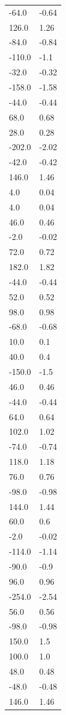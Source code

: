 \begin{longtable}{ll}
-64.0 & -0.64 \\
126.0 & 1.26 \\
-84.0 & -0.84 \\
-110.0 & -1.1 \\
-32.0 & -0.32 \\
-158.0 & -1.58 \\
-44.0 & -0.44 \\
68.0 & 0.68 \\
28.0 & 0.28 \\
-202.0 & -2.02 \\
-42.0 & -0.42 \\
146.0 & 1.46 \\
4.0 & 0.04 \\
4.0 & 0.04 \\
46.0 & 0.46 \\
-2.0 & -0.02 \\
72.0 & 0.72 \\
182.0 & 1.82 \\
-44.0 & -0.44 \\
52.0 & 0.52 \\
98.0 & 0.98 \\
-68.0 & -0.68 \\
10.0 & 0.1 \\
40.0 & 0.4 \\
-150.0 & -1.5 \\
46.0 & 0.46 \\
-44.0 & -0.44 \\
64.0 & 0.64 \\
102.0 & 1.02 \\
-74.0 & -0.74 \\
118.0 & 1.18 \\
76.0 & 0.76 \\
-98.0 & -0.98 \\
144.0 & 1.44 \\
60.0 & 0.6 \\
-2.0 & -0.02 \\
-114.0 & -1.14 \\
-90.0 & -0.9 \\
96.0 & 0.96 \\
-254.0 & -2.54 \\
56.0 & 0.56 \\
-98.0 & -0.98 \\
150.0 & 1.5 \\
100.0 & 1.0 \\
48.0 & 0.48 \\
-48.0 & -0.48 \\
146.0 & 1.46 \\

\end{longtable}
